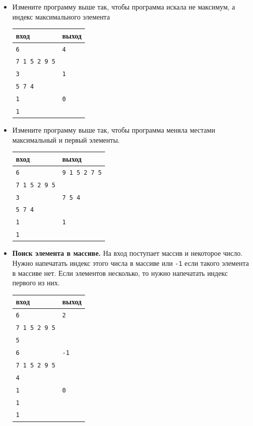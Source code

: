 \documentclass{article}
\begin{document}
\begin{itemize}
\item Измените программу выше так, чтобы программа искала не максимум, а индекс максимального элемента
\begin{center}
\begin{tabular}{ l | l }
 вход & выход \\ \hline
 \texttt{6} & \texttt{4}  \\ 
 \texttt{7 1 5 2 9 5} &   \\ \hline
 \texttt{3} & \texttt{1}  \\ 
 \texttt{5 7 4} &   \\ \hline
 \texttt{1} & \texttt{0}  \\ 
 \texttt{1} &   \\
\end{tabular}
\end{center}

\item Измените программу выше так, чтобы программа меняла местами максимальный и первый элементы.
\begin{center}
\begin{tabular}{ l | l }
 вход & выход \\ \hline
 \texttt{6} & \texttt{9 1 5 2 7 5}  \\ 
 \texttt{7 1 5 2 9 5} &   \\ \hline
 \texttt{3} & \texttt{7 5 4}  \\ 
 \texttt{5 7 4} &   \\ \hline
 \texttt{1} & \texttt{1}  \\ 
 \texttt{1} &   \\
\end{tabular}
\end{center}

\item \textbf{Поиск элемента в массиве.} На вход поступает массив и некоторое число. Нужно напечатать индекс этого числа в массиве или \texttt{-1} если такого элемента в массиве нет. Если элементов несколько, то нужно напечатать индекс первого из них.
\begin{center}
\begin{tabular}{ l | l }
 вход & выход \\ \hline
 \texttt{6} & \texttt{2}  \\ 
 \texttt{7 1 5 2 9 5} &   \\
 \texttt{5} &   \\ \hline

 \texttt{6} & \texttt{-1}  \\ 
 \texttt{7 1 5 2 9 5} &   \\
 \texttt{4} &   \\ \hline
 
 \texttt{1} & \texttt{0}  \\ 
 \texttt{1} &   \\
 \texttt{1} &   \\
\end{tabular}
\end{center}
\end{itemize}
\end{document}
